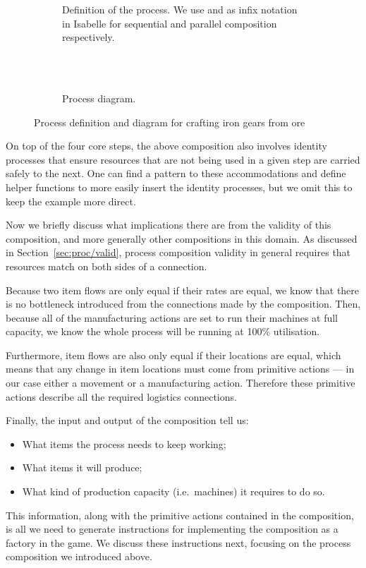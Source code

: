 \documentclass[class=smolathesis,crop=false]{standalone}
\begin{document}
\begin{figure}[htbp]
  \begin{subfigure}{\textwidth}
    \begin{isabelle}
      
    \end{isabelle}
    \caption{Definition of the process. We use \isa{\isacharsemicolon\isacharsemicolon} and \isa{\isasymparallel} as infix notation in Isabelle for sequential and parallel composition respectively.}
  \end{subfigure}
  \\~\\
  \begin{subfigure}{\textwidth}
    \centering
    
    \caption{Process diagram.}
  \end{subfigure}
  \caption{Process definition and diagram for crafting iron gears from ore}
    \label{fig:fourGears}
\end{figure}

On top of the four core steps, the above composition also involves identity processes that ensure resources that are not being used in a given step are carried safely to the next.
One can find a pattern to these accommodations and define helper functions to more easily insert the identity processes, but we omit this to keep the example more direct.

Now we briefly discuss what implications there are from the validity of this composition, and more generally other compositions in this domain.
As discussed in Section~\ref{sec:proc/valid}, process composition validity in general requires that resources match on both sides of a connection.

Because two item flows are only equal if their rates are equal, we know that there is no bottleneck introduced from the connections made by the composition.
Then, because all of the manufacturing actions are set to run their machines at full capacity, we know the whole process will be running at 100\% utilisation.

Furthermore, item flows are also only equal if their locations are equal, which means that any change in item locations must come from primitive actions --- in our case either a movement or a manufacturing action.
Therefore these primitive actions describe all the required logistics connections.

Finally, the input and output of the composition tell us:
\begin{itemize}
  \item What items the process needs to keep working;
  \item What items it will produce;
  \item What kind of production capacity (i.e.\ machines) it requires to do so.
\end{itemize}
This information, along with the primitive actions contained in the composition, is all we need to generate instructions for implementing the composition as a factory in the game.
We discuss these instructions next, focusing on the process composition we introduced above.
\end{document}
